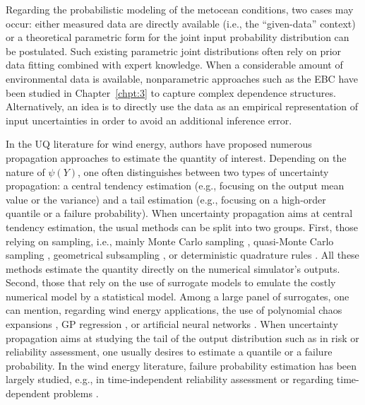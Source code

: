 Regarding the probabilistic modeling of the metocean conditions, two cases may occur: either measured data are directly available (i.e., the ``given-data'' context) or a theoretical parametric form for the joint input probability distribution can be postulated.
Such existing parametric joint distributions often rely on prior data fitting combined with expert knowledge. 
When a considerable amount of environmental data is available, nonparametric approaches such as the EBC have been studied in Chapter~\ref{chpt:3} to capture complex dependence structures. 
Alternatively, an idea is to directly use the data as an empirical representation of input uncertainties in order to avoid an additional inference error. 

In the UQ literature for wind energy, authors have proposed numerous propagation approaches to estimate the quantity of interest.
Depending on the nature of $\psi(Y)$, one often distinguishes between two types of uncertainty propagation: a central tendency estimation (e.g., focusing on the output mean value or the variance) and a tail estimation (e.g., focusing on a high-order quantile or a failure probability). 
When uncertainty propagation aims at central tendency estimation, the usual methods can be split into two groups. 
First, those relying on sampling, i.e., mainly Monte Carlo sampling \citep{graf_2016}, quasi-Monte Carlo sampling \citep{muller_cheng_2018}, geometrical subsampling \citep{kanner_2018_OMAE}, or deterministic quadrature rules \citep{bos_2020}. 
All these methods estimate the quantity directly on the numerical simulator's outputs. 
Second, those that rely on the use of surrogate models to emulate the costly numerical model by a statistical model. 
Among a large panel of surrogates, one can mention, regarding wind energy applications, the use of polynomial chaos expansions \citep{dimitrov_kelly_2018, murcia_dimitrov_2018}, GP regression \citep{huchet_2018,teixeira_gp_2019,slot_sorensen_2020,wilkie_galasso_2021}, or artificial neural networks \citep{aoues_2023}. 
When uncertainty propagation aims at studying the tail of the output distribution such as in risk or reliability assessment, one usually desires to estimate a quantile or a failure probability. 
In the wind energy literature, failure probability estimation has been largely studied, e.g., in time-independent reliability assessment \citep{zwick_muskulus_2015,slot_sorensen_2020,wilkie_galasso_2021} or regarding time-dependent problems \citep{abdallah_lataniotis_2019,lataniotis_2019}.

